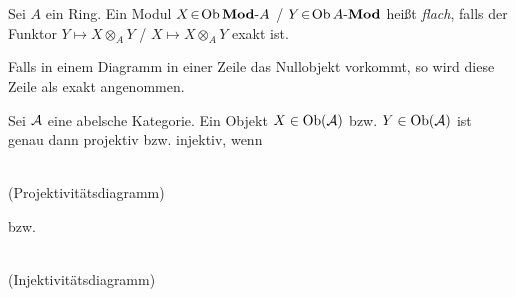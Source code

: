 \documentclass{cheat-sheet}
\newcommand{\AMod}{\text{$A$-$\Mod$}} %
\newcommand{\ModA}{\text{$\Mod$-$A$}} %
\begin{document}
\begin{defn}
  Sei $A$ ein Ring. Ein Modul $X \!\in\! \Ob \ModA$ / $Y \!\in\! \Ob \AMod$
  heißt \emph{flach}, falls der Funktor $Y \mapsto X \otimes_A Y$ / $X \mapsto X \otimes_A Y$ exakt ist.
\end{defn}

\begin{konv}
  Falls in einem Diagramm in einer Zeile das Nullobjekt vorkommt, so wird diese Zeile als exakt angenommen.
\end{konv}

\begin{bem}
  Sei $\mathcal{A}$ eine abelsche Kategorie. Ein Objekt $X \in \operatorname{Ob}(\mathcal{A})$ bzw. $Y \in \operatorname{Ob}(\mathcal{A})$ ist genau dann projektiv bzw. injektiv, wenn
  \vspace{-10pt}
  \begin{center}
    \begin{minipage}{100pt}
      \begin{center}
         \\
        (Projektivitätsdiagramm)
      \end{center}
    \end{minipage}
    \hspace{8pt}
    \begin{minipage}[t]{10pt}
      \vspace{-10pt}
      bzw.
    \end{minipage}
    \hspace{12pt}
    \begin{minipage}{100pt}
      \begin{center}
         \\
        (Injektivitätsdiagramm)
      \end{center}
    \end{minipage}
  \end{center}
\end{bem}
\end{document}
